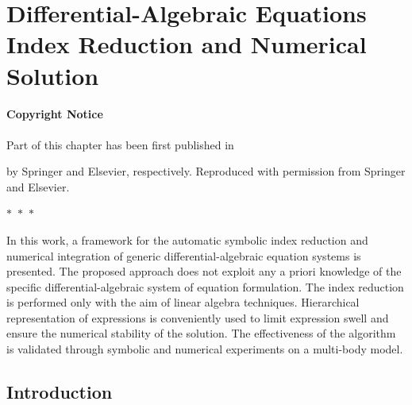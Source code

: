 
\chapter{Differential-Algebraic Equations Index Reduction and Numerical Solution}
\label{chap6:daes}

\subsubsection{Copyright Notice}
Part of this chapter has been first published in
%
\begin{center}
  \begin{minipage}{0.9\textwidth}
  \end{minipage}
\end{center}
\begin{center}
  \begin{minipage}{0.9\textwidth}
  \end{minipage}
\end{center}
%
by Springer and Elsevier, respectively. Reproduced with permission from Springer and Elsevier.

\begin{center}
  $\ast$~$\ast$~$\ast$
\end{center}

In this work, a framework for the automatic symbolic index reduction and numerical integration of generic differential-algebraic equation systems is presented. The proposed approach does not exploit any a priori knowledge of the specific differential-algebraic system of equation formulation. The index reduction is performed only with the aim of linear algebra techniques. Hierarchical representation of expressions is conveniently used to limit expression swell and ensure the numerical stability of the solution. The effectiveness of the algorithm is validated through symbolic and numerical experiments on a multi-body model.


\section{Introduction}
\label{chap6:sec:introduction}

